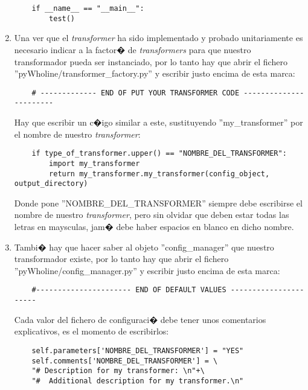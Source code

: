 \documentclass[a4paper,10pt]{book}
\begin{document}
\begin{enumerate}
\begin{verbatim}
    if __name__ == "__main__":
        test()

    \end{verbatim}

\item Una ver que el \textit{transformer} ha sido implementado y probado unitariamente
es necesario indicar a la factor� de \textit{transformers} para que nuestro transformador
pueda ser instanciado, por lo tanto hay que abrir el fichero ''pyWholine/transformer\_factory.py''
y escribir justo encima de esta marca:

    \begin{center}
    \begin{verbatim}
    # ------------- END OF PUT YOUR TRANSFORMER CODE -----------------------
    \end{verbatim}
    \end{center}

Hay que escribir un c�igo similar a este, sustituyendo ''my\_transformer'' por el
nombre de nuestro \textit{transformer}:

    \begin{verbatim}
    if type_of_transformer.upper() == "NOMBRE_DEL_TRANSFORMER":
        import my_transformer
        return my_transformer.my_transformer(config_object, output_directory)
    \end{verbatim}

Donde pone ''NOMBRE\_DEL\_TRANSFORMER'' siempre debe escribirse el nombre de
nuestro \textit{transformer}, pero sin olvidar que deben estar todas las letras en maysculas, jam�
debe haber espacios en blanco en dicho nombre.

\item Tambi� hay que hacer saber al objeto ''config\_manager'' que nuestro transformador
existe, por lo tanto hay que abrir el fichero ''pyWholine/config\_manager.py''
y escribir justo encima de esta marca:

    \begin{center}
    \begin{verbatim}
    #---------------------- END OF DEFAULT VALUES ----------------------
    \end{verbatim}
    \end{center}

Cada valor del fichero de configuraci� debe tener unos comentarios explicativos,
es el momento de escribirlos:

    \begin{verbatim}
    self.parameters['NOMBRE_DEL_TRANSFORMER'] = "YES"
    self.comments['NOMBRE_DEL_TRANSFORMER'] = \
    "# Description for my transformer: \n"+\
    "#  Additional description for my transformer.\n"
    \end{verbatim}


\end{enumerate}
\end{document}
